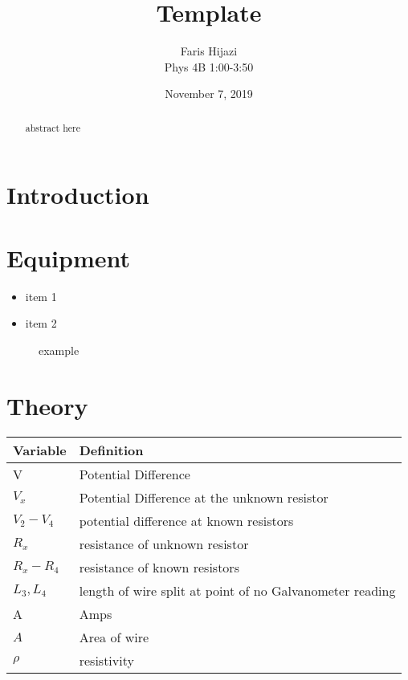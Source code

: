 \documentclass[letterpaper, 12pt]{article}
\title{Template}
\date{November 7, 2019}
\author{Faris Hijazi\\
        Phys 4B 1:00-3:50\\}
\begin{document}
\begin{titlingpage}
    \maketitle
    \begin{abstract}
        abstract here
    \end{abstract}
\end{titlingpage}


\section*{Introduction} 

\section*{Equipment}

\begin{itemize}
    \item item 1
    \item item 2
\end{itemize}

\begin{figure}[H]
    \centering
    \caption{example}
    \label{fig:example}
\end{figure}

\section*{Theory}

\begin{table}[H]
\begin{tabular}{|l|l|}
\hline
\textbf{Variable}   & \textbf{Definition}                                            \\
    \hline
    V                       & Potential Difference                                   \\
    \hline
    \(V_x\)                 & Potential Difference at the unknown resistor           \\
    \hline
    \(V_2 - V_4\)           & potential difference at known resistors                \\
    \hline
    \(R_x\)                 & resistance of unknown resistor                         \\
    \hline
    \(R_x - R_4\)           & resistance of known resistors                          \\
    \hline
    \(L_3, L_4\)            & length of wire split at point of no Galvanometer reading \\
    \hline
    A                       & Amps                                                   \\
    \hline
    \(A\)                   & Area of wire                                           \\
    \hline
    \(\rho\)                & resistivity                                            \\
    \hline                                       
\end{tabular}
\end{table}
\end{document}
